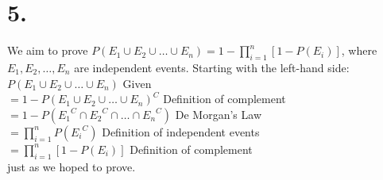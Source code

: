 \documentclass{article}
\begin{document}
\section*{5.}
{\Large 

We aim to prove $P(E_1 \cup E_2 \cup \dots \cup E_n) = 1 - \prod_{i=1}^n [1 - P(E_i)]$, where $E_1,E_2, \dots ,E_n$ are independent events. Starting with the left-hand side: \\ 
$P(E_1 \cup E_2 \cup \dots \cup E_n)$ \hfill Given\\
$= 1 - P(E_1 \cup E_2 \cup \dots \cup E_n)^C$ \hfill Definition of complement\\
$= 1 - P({E_1}^C \cap {E_2}^C \cap \dots \cap {E_n}^C)$ \hfill De Morgan's Law\\
$= \prod_{i = 1}^n P({E_i}^C)$ \hfill Definition of independent events\\
$= \prod_{i = 1}^n [1 - P(E_i)]$ \hfill Definition of complement\\
just as we hoped to prove.

}
\end{document}
